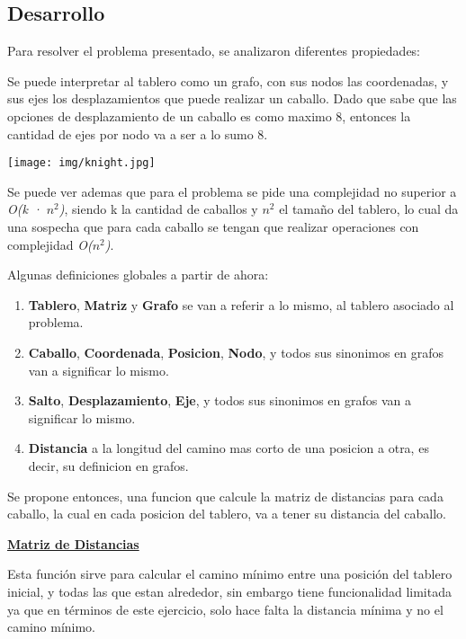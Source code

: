 \newpage
\subsection{Desarrollo}

Para resolver el problema presentado, se analizaron diferentes propiedades:

Se puede interpretar al tablero como un grafo, con sus nodos las coordenadas, y sus ejes los desplazamientos que puede realizar un caballo. Dado que sabe que las opciones de desplazamiento de un caballo es como maximo 8, entonces la cantidad de ejes por nodo va a ser a lo sumo 8.

\begin{center}
\texttt{[image: img/knight.jpg]}
\end{center}

Se puede ver ademas que para el problema se pide una complejidad no superior a \textit{O(k · $n^2$)}, siendo k la cantidad de caballos y $n^2$ el tamaño del tablero, lo cual da una sospecha que para cada caballo se tengan que realizar operaciones con complejidad \textit{O($n^2$)}.

\bigskip
Algunas definiciones globales a partir de ahora:
\begin{enumerate}
\item \textbf{Tablero}, \textbf{Matriz} y \textbf{Grafo} se van a referir a lo mismo, al tablero asociado al problema.
\item \textbf{Caballo}, \textbf{Coordenada}, \textbf{Posicion}, \textbf{Nodo}, y todos sus sinonimos en grafos van a significar lo mismo.
\item \textbf{Salto}, \textbf{Desplazamiento}, \textbf{Eje}, y todos sus sinonimos en grafos van a significar lo mismo.
\item \textbf{Distancia} a la longitud del camino mas corto de una posicion a otra, es decir, su definicion en grafos.
\end{enumerate}

\bigskip
Se propone entonces, una funcion que calcule la matriz de distancias para cada caballo, la cual en cada posicion del tablero, va a tener su distancia del caballo.

\bigskip

\noindent \underline{\textbf{Matriz de Distancias}}

Esta función sirve para calcular el camino mínimo entre una posición del tablero inicial, y todas las que estan alrededor, sin embargo tiene funcionalidad limitada ya que en términos de este ejercicio, solo hace falta la distancia mínima y no el camino mínimo.

